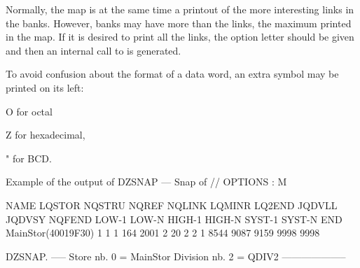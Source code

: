 Normally, the map is at the same time a printout of the more
interesting links in the banks.
However, banks may have more than the  links, the maximum printed in the map.
If it is desired to print all the links,
the option letter  should be given and
then an internal  call to  is generated.

To avoid confusion about the format of a data word,
an extra symbol may be printed on its left:
\begin{DLttc}{12}
\item[O]for octal
\item[Z]for hexadecimal,
\item["]for BCD.
\end{DLttc}

\begin{landscapebody}
\mbox{}\vspace*{1cm}
\begin{XMPt}{Example of the output of }
DZSNAP --- Snap of //                                                                              OPTIONS : M                   
                                                                                                                                 
  NAME       LQSTOR NQSTRU  NQREF NQLINK LQMINR LQ2END JQDVLL JQDVSY NQFEND  LOW-1  LOW-N HIGH-1 HIGH-N SYST-1 SYST-N    END     
 MainStor(40019F30)      1      1      1    164   2001      2     20      2      2      1   8544   9087   9159   9998   9998     
                                                                                                                                 
DZSNAP.   -----  Store nb. 0 = MainStor Division nb. 2 = QDIV2                       --------------------                        
                                                                                                                                 

\end{XMPt}
\end{landscapebody}
